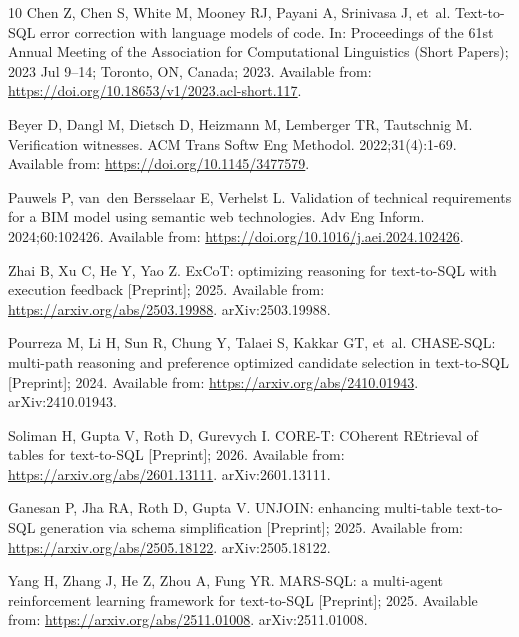 \begin{thebibliography}{10}
Chen Z, Chen S, White M, Mooney RJ, Payani A, Srinivasa J, et~al.
\newblock Text-to-SQL error correction with language models of code.
\newblock In: Proceedings of the 61st Annual Meeting of the Association for
  Computational Linguistics (Short Papers); 2023 Jul 9--14; Toronto, ON,
  Canada; 2023. Available from:
  \url{https://doi.org/10.18653/v1/2023.acl-short.117}.

Beyer D, Dangl M, Dietsch D, Heizmann M, Lemberger TR, Tautschnig M.
\newblock Verification witnesses.
\newblock ACM Trans Softw Eng Methodol. 2022;31(4):1-69.
\newblock Available from: \url{https://doi.org/10.1145/3477579}.

Pauwels P, van~den Bersselaar E, Verhelst L.
\newblock Validation of technical requirements for a BIM model using semantic
  web technologies.
\newblock Adv Eng Inform. 2024;60:102426.
\newblock Available from: \url{https://doi.org/10.1016/j.aei.2024.102426}.

Zhai B, Xu C, He Y, Yao Z.
\newblock ExCoT: optimizing reasoning for text-to-SQL with execution feedback
  [Preprint]; 2025.
\newblock Available from: \url{https://arxiv.org/abs/2503.19988}.
\newblock arXiv:2503.19988.

Pourreza M, Li H, Sun R, Chung Y, Talaei S, Kakkar GT, et~al.
\newblock CHASE-SQL: multi-path reasoning and preference optimized candidate
  selection in text-to-SQL [Preprint]; 2024.
\newblock Available from: \url{https://arxiv.org/abs/2410.01943}.
\newblock arXiv:2410.01943.

Soliman H, Gupta V, Roth D, Gurevych I.
\newblock CORE-T: COherent REtrieval of tables for text-to-SQL [Preprint];
  2026.
\newblock Available from: \url{https://arxiv.org/abs/2601.13111}.
\newblock arXiv:2601.13111.

Ganesan P, Jha RA, Roth D, Gupta V.
\newblock UNJOIN: enhancing multi-table text-to-SQL generation via schema
  simplification [Preprint]; 2025.
\newblock Available from: \url{https://arxiv.org/abs/2505.18122}.
\newblock arXiv:2505.18122.

Yang H, Zhang J, He Z, Zhou A, Fung YR.
\newblock MARS-SQL: a multi-agent reinforcement learning framework for
  text-to-SQL [Preprint]; 2025.
\newblock Available from: \url{https://arxiv.org/abs/2511.01008}.
\newblock arXiv:2511.01008.


\end{thebibliography}
